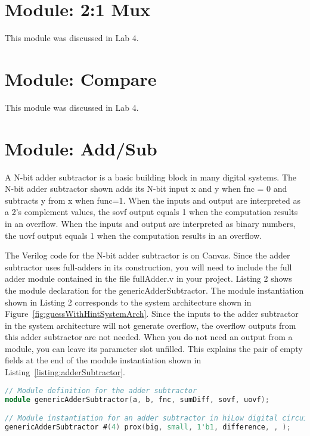 \section{Module: 2:1 Mux}
This module was discussed in Lab 4.

\section{Module: Compare}
This module was discussed in Lab 4.

\section{Module: Add/Sub }

A N-bit adder subtractor is a basic building block in many digital
systems. The N-bit adder subtractor shown adds its N-bit
input x and y when fnc = 0 and subtracts y from x when func=1. When
the inputs and output are interpreted as a 2's complement values, the
sovf output equals 1 when the computation results in an overflow. When
the inputs and output are interpreted as binary numbers, the uovf output
equals 1 when the computation results in an overflow.

The Verilog code for the N-bit adder subtractor is on Canvas. Since the
adder subtractor uses full-adders in its construction, you will need to
include the full adder module contained in the file fullAdder.v in your
project. Listing 2 shows the module declaration for the genericAdderSubtractor.
The module
instantiation shown in Listing 2 corresponds to the system architecture
shown in Figure~\ref{fig:guessWithHintSystemArch}. Since the inputs to the adder subtractor in the
system architecture will not generate overflow, the overflow outputs
from this adder subtractor are not needed. When you do not need an
output from a module, you can leave its parameter slot unfilled. This
explains the pair of empty fields at the end of the module instantiation
shown in Listing~\ref{listing:adderSubtractor}.

\begin{lstlisting}[language=Verilog,
 caption={Top, module definition for an adder subtractor.  Bottom, module instantation
 of the adder subtractor in Figure~\ref{fig:guessWithHintSystemArch}.},
 label={listing:adderSubtractor},
 frame=single]
// Module definition for the adder subtractor
module genericAdderSubtractor(a, b, fnc, sumDiff, sovf, uovf);

// Module instantiation for an adder subtractor in hiLow digital circuit
genericAdderSubtractor #(4) prox(big, small, 1'b1, difference, , );
\end{lstlisting}

